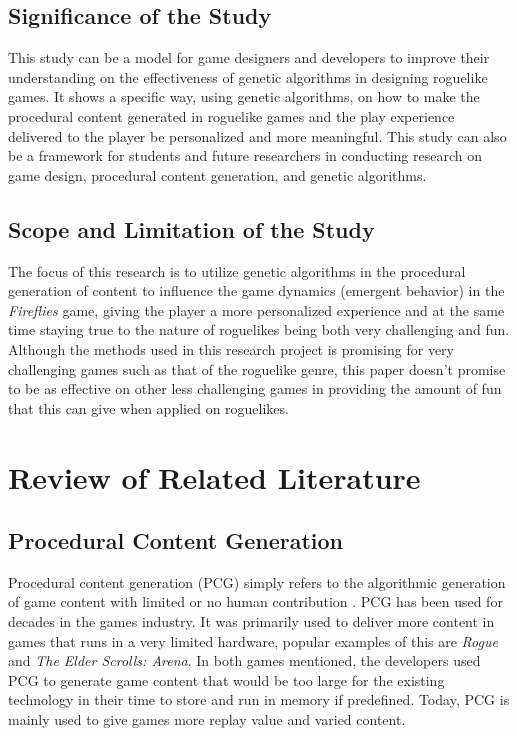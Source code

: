 \documentclass[11pt,a4paper,twocolumn]{article}
\begin{document}
\subsection{Significance of the Study}
This study can be a model for game designers and developers to improve their understanding on the effectiveness of genetic algorithms in designing roguelike games. It shows a specific way, using genetic algorithms, on how to make the procedural content generated in roguelike games and the play experience delivered to the player be personalized and more meaningful.
This study can also be a framework for students and future researchers in conducting research on game design, procedural content generation, and genetic algorithms.

\subsection{Scope and Limitation of the Study}

The focus of this research is to utilize genetic algorithms in the procedural generation of content to influence the game dynamics (emergent behavior) in the {\em Fireflies} game, giving the player a more personalized experience and at the same time staying true to the nature of roguelikes being both very challenging and fun. 
Although the methods used in this research project is promising for very challenging games such as that of the roguelike genre, this paper doesn't promise to be as effective on other less challenging games in providing the amount of fun that this can give when applied on roguelikes.

\section{Review of Related Literature}

\subsection{Procedural Content Generation}

Procedural content generation (PCG) simply refers to the algorithmic generation of game content with limited or no human contribution \cite{Togelius1, Togelius2}. PCG has been used for decades in the games industry. It was primarily used to deliver more content in games that runs in a very limited hardware, popular examples of this are {\em Rogue}\cite{Toy} and {\em The Elder Scrolls: Arena}\cite{Bethesda}. In both games mentioned, the developers used PCG to generate game content that would be too large for the existing technology in their time to store and run in memory if predefined. Today, PCG is mainly used to give games more replay value and varied content.
\end{document}
